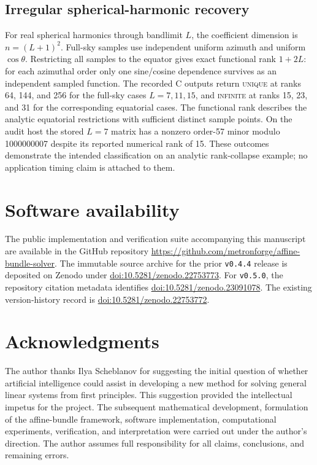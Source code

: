 \documentclass[11pt]{article}
\theoremstyle{definition}
\begin{document}
\subsection{Irregular spherical-harmonic recovery}
For real spherical harmonics through bandlimit $L$, the coefficient dimension
is $n=(L+1)^2$. Full-sky samples use independent uniform azimuth and uniform
$\cos\theta$. Restricting all samples to the equator gives exact functional
rank $1+2L$: for each azimuthal order only one sine/cosine dependence survives
as an independent sampled function. The recorded C outputs return
\textsc{unique} at ranks 64, 144, and 256 for the full-sky cases
$L=7,11,15$, and \textsc{infinite} at ranks 15, 23, and 31 for the
corresponding equatorial cases. The functional rank describes the analytic equatorial restrictions with sufficient distinct sample points. On the audit host the stored $L=7$ matrix has a nonzero order-57 minor modulo 1000000007 despite its reported numerical rank of 15. These outcomes demonstrate the intended
classification on an analytic rank-collapse example; no application timing
claim is attached to them.

\section*{Software availability}
The public implementation and verification suite accompanying this manuscript
are available in the GitHub repository
\url{https://github.com/metronforge/affine-bundle-solver}. The immutable source
archive for the prior \texttt{v0.4.4} release is deposited on Zenodo under
\href{https://doi.org/10.5281/zenodo.22753773}{doi:10.5281/zenodo.22753773}.
For \texttt{v0.5.0}, the repository citation metadata identifies
\href{https://doi.org/10.5281/zenodo.23091078}{doi:10.5281/zenodo.23091078}.
The existing version-history record is
\href{https://doi.org/10.5281/zenodo.22753772}{doi:10.5281/zenodo.22753772}.

\section*{Acknowledgments}
The author thanks Ilya Scheblanov for suggesting the initial question of whether
artificial intelligence could assist in developing a new method for solving
general linear systems from first principles. This suggestion provided the
intellectual impetus for the project. The subsequent mathematical development,
formulation of the affine-bundle framework, software implementation,
computational experiments, verification, and interpretation were carried out
under the author's direction. The author assumes full responsibility for all
claims, conclusions, and remaining errors.
\end{document}
